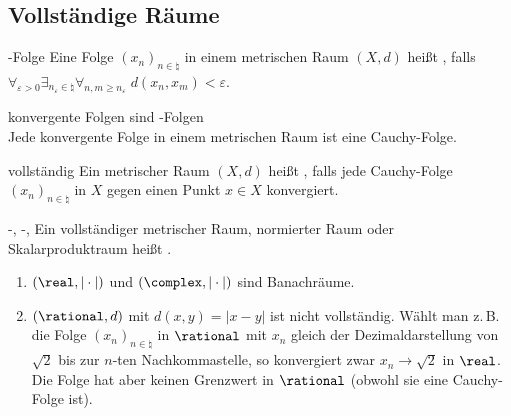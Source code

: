 \pagebreak

\subsection{%
    Vollständige Räume%
}

\begin{Def}{-Folge}
    Eine Folge $(x_n)_{n \in \natural}$ in einem metrischen Raum $(X, d)$ heißt
    , falls
    $\forall_{\varepsilon > 0} \exists_{n_\varepsilon \in \natural}
    \forall_{n, m \ge n_\varepsilon}\; d(x_n, x_m) < \varepsilon$.
\end{Def}

\begin{Lemma}{konvergente Folgen sind -Folgen}\\
    Jede konvergente Folge in einem metrischen Raum ist eine Cauchy-Folge.
\end{Lemma}

\begin{Def}{vollständig}
    Ein metrischer Raum $(X, d)$ heißt , falls jede Cauchy-Folge
    $(x_n)_{n \in \natural}$ in $X$ gegen einen Punkt $x \in X$ konvergiert.
\end{Def}

\begin{Def}{-, -, }
    Ein vollständiger metrischer Raum, normierter Raum oder Skalarproduktraum heißt
    .
\end{Def}

\begin{Bsp}
    \begin{enumerate}[label=\emph{(\alph*)}]
        \item
        $(\real, |\cdot|)$ und $(\complex, |\cdot|)$ sind Banachräume.
        
        \item
        $(\rational, d)$ mit $d(x, y) = |x - y|$ ist nicht vollständig.
        Wählt man z.\,B. die Folge $(x_n)_{n \in \natural}$ in $\rational$ mit
        $x_n$ gleich der Dezimaldarstellung von $\sqrt{2}$ bis zur $n$-ten Nachkommastelle,
        so konvergiert zwar $x_n \to \sqrt{2}$ in $\real$.
        Die Folge hat aber keinen Grenzwert in $\rational$ (obwohl sie eine Cauchy-Folge ist).
    \end{enumerate}
\end{Bsp}


